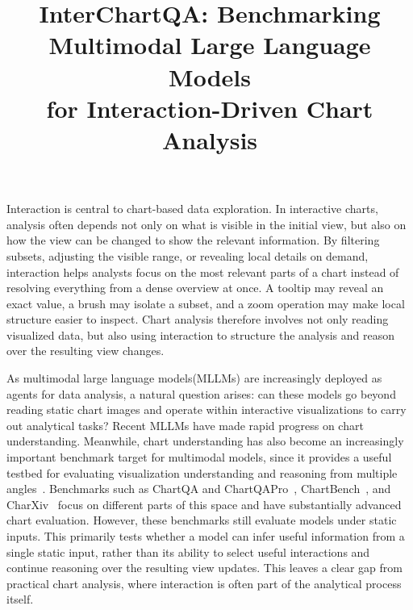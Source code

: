 \documentclass[review,journal,hideappendix]{vgtc} %
\title{InterChartQA: Benchmarking Multimodal Large Language Models\\ for Interaction-Driven Chart Analysis}
\begin{document}



\maketitle

Interaction is central to chart-based data exploration. In interactive charts, analysis often depends not only on what is visible in the initial view, but also on how the view can be changed to show the relevant information. By filtering subsets, adjusting the visible range, or revealing local details on demand, interaction helps analysts focus on the most relevant parts of a chart instead of resolving everything from a dense overview at once. A tooltip may reveal an exact value, a brush may isolate a subset, and a zoom operation may make local structure easier to inspect. Chart analysis therefore involves not only reading visualized data, but also using interaction to structure the analysis and reason over the resulting view changes.

As multimodal large language models(MLLMs) are increasingly deployed as agents for data analysis, a natural question arises: can these models go beyond reading static chart images and operate within interactive visualizations to carry out analytical tasks? Recent MLLMs have made rapid progress on chart understanding. Meanwhile, chart understanding has also become an increasingly important benchmark target for multimodal models, since it provides a useful testbed for evaluating visualization understanding and reasoning from multiple angles~\cite{khanEvaluatingLLMsVisualization2025}. Benchmarks such as ChartQA and ChartQAPro~\cite{masryChartQABenchmarkQuestion2022,masryChartQAProMoreDiverse2025}, ChartBench~\cite{xuChartBenchBenchmarkComplex2024}, and CharXiv~\cite{wangCharXivChartingGaps2024} focus on different parts of this space and have substantially advanced chart evaluation. However, these benchmarks still evaluate models under static inputs. This primarily tests whether a model can infer useful information from a single static input, rather than its ability to select useful interactions and continue reasoning over the resulting view updates. This leaves a clear gap from practical chart analysis, where interaction is often part of the analytical process itself.
\end{document}
